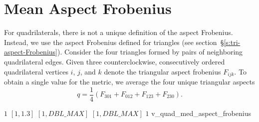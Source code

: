\section{Mean Aspect Frobenius}

For quadrilaterals, there is not a unique definition of the aspect Frobenius.
Instead, we use the aspect Frobenius
defined for triangles (see section~\S\ref{s:tri-aspect-Frobenius}).
Consider the four triangles formed by pairs of neighboring quadrilateral edges.
Given three counterclockwise, consecutively ordered quadrilateral vertices $i$, $j$, and $k$
denote the triangular aspect frobenius $F_{ijk}$.
To obtain a single value for the metric, we average the four unique triangular aspects
\[
  q = \frac{1}{4}\left(F_{301} + F_{012} + F_{123} + F_{230}\right).
\]

%
{$1$}%
{$[1,1.3]$}%
{$[1,DBL\_MAX]$}%
{$[1,DBL\_MAX]$}%
{$1$}%
{\cite{pebay:04}}%
{v\_quad\_med\_aspect\_frobenius}%

